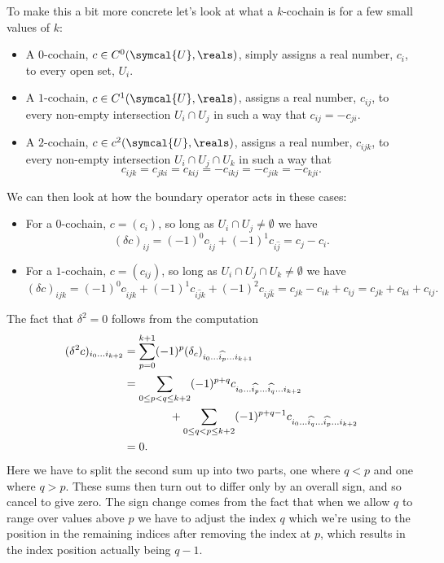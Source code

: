\documentclass[fleqn]{NotesClass}
\newcommand{\openCover}{\symcal{U}}
\begin{document}
    To make this a bit more concrete let's look at what a \(k\)-cochain is for a few small values of \(k\):
    \begin{itemize}
        \item A \(0\)-cochain, \(c \in C^0(\openCover, \reals)\), simply assigns a real number, \(c_i\), to every open set, \(U_i\).
        \item A \(1\)-cochain, \(c \in C^1(\openCover, \reals)\), assigns a real number, \(c_{ij}\), to every non-empty intersection \(U_i \cap U_j\) in such a way that \(c_{ij} = -c_{ji}\).
        \item A \(2\)-cochain, \(c \in c^2(\openCover, \reals)\), assigns a real number, \(c_{ijk}\), to every non-empty intersection \(U_i \cap U_j \cap U_k\) in such a way that
        \begin{equation}
            c_{ijk} = c_{jki} = c_{kij} = -c_{ikj} = -c_{jik} = -c_{kji}. 
        \end{equation}
    \end{itemize}
    We can then look at how the boundary operator acts in these cases:
    \begin{itemize}
        \item For a \(0\)-cochain, \(c = (c_i)\), so long as \(U_i \cap U_j \ne \emptyset\) we have
        \begin{equation}
            (\delta c)_{ij} = (-1)^0 c_{\widehat{i}j} + (-1)^1 c_{i\widehat{j}} = c_{j} - c_{i}.
        \end{equation}
        \item For a \(1\)-cochain, \(c = (c_{ij})\), so long as \(U_i \cap U_j \cap U_k \ne \emptyset\) we have
        \begin{equation}
            (\delta c)_{ijk} = (-1)^0 c_{\widehat{i}jk} + (-1)^1 c_{i\widehat{j}k} + (-1)^2 c_{ij\widehat{k}} = c_{jk} - c_{ik} + c_{ij} = c_{jk} + c_{ki} + c_{ij}.
        \end{equation}
    \end{itemize}
    
    The fact that \(\delta^2 = 0\) follows from the computation
    \begin{align}
        (\delta^2 c)_{i_0 \dotso i_{k+2}} &= \sum_{p = 0}^{k + 1} (-1)^{p} (\delta_c)_{i_0 \dotso \widehat{i_{p}} \dotso i_{k+1}}\\
        &= \sum_{0 \le p < q \le k + 2} (-1)^{p + q} c_{i_0 \dotso \widehat{i_p} \dotso \widehat{i_q} \dotso i_{k+2}}\\
        &\qquad\qquad+ \sum_{0 \le q < p \le k + 2} (-1)^{p + q - 1} c_{i_0 \dotso \widehat{i_q} \dotso \widehat{i_p} \dotso i_{k + 2}} \notag\\
        &= 0.
    \end{align}
    Here we have to split the second sum up into two parts, one where \(q < p\) and one where \(q > p\).
    These sums then turn out to differ only by an overall sign, and so cancel to give zero.
    The sign change comes from the fact that when we allow \(q\) to range over values above \(p\) we have to adjust the index \(q\) which we're using to the position in the remaining indices after removing the index at \(p\), which results in the index position actually being \(q - 1\).
    
\end{document}
